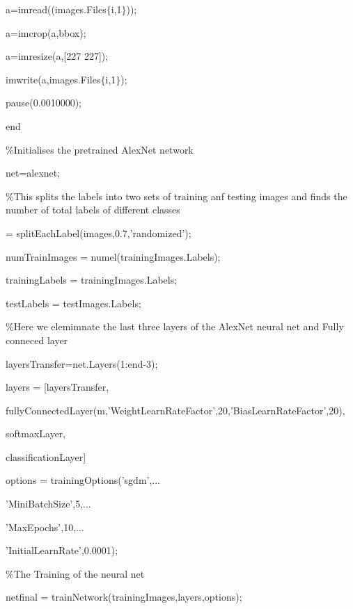 \documentclass{article} %
\begin{document}
\noindent         a=imread((images.Files$\{$i,1$\}$));

\noindent         a=imcrop(a,bbox);

\noindent         a=imresize(a,[227 227]);

\noindent         imwrite(a,images.Files$\{$i,1$\}$);

\noindent         pause(0.0010000); 

\noindent end

\noindent 

\noindent \%Initialises the pretrained AlexNet network

\noindent net=alexnet;

\noindent 

\noindent \%This splits the labels into two sets of training anf testing images and finds the number of total labels of different classes

 = splitEachLabel(images,0.7,'randomized');

\noindent numTrainImages = numel(trainingImages.Labels);

\noindent trainingLabels = trainingImages.Labels;

\noindent testLabels = testImages.Labels;

\noindent 

\noindent \%Here we elemimnate the last three layers of the AlexNet neural net and Fully conneced layer  

\noindent layersTransfer=net.Layers(1:end-3);

\noindent layers = [layersTransfer,

\noindent     fullyConnectedLayer(m,'WeightLearnRateFactor',20,'BiasLearnRateFactor',20),

\noindent     softmaxLayer,

\noindent     classificationLayer]

\noindent 

\noindent options = trainingOptions('sgdm',...

\noindent     'MiniBatchSize',5,...

\noindent     'MaxEpochs',10,...

\noindent    'InitialLearnRate',0.0001);

\noindent 

\noindent \%The Training of the neural net

\noindent netfinal = trainNetwork(trainingImages,layers,options);

\noindent 
\end{document}
